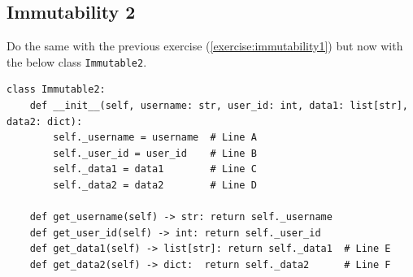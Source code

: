 \documentclass[oneside,11pt,dvipsnames]{book}
\newcommand{\code}[1]{\texttt{#1}}
\begin{document}
\subsection{Immutability 2}\label{exercise:immutability2}
Do the same with the previous exercise (\autoref{exercise:immutability1}) but now with the below class \code{Immutable2}.
\begin{lstlisting}
class Immutable2:
    def __init__(self, username: str, user_id: int, data1: list[str], data2: dict):
        self._username = username  # Line A
        self._user_id = user_id    # Line B
        self._data1 = data1        # Line C
        self._data2 = data2        # Line D
        
    def get_username(self) -> str: return self._username
    def get_user_id(self) -> int: return self._user_id
    def get_data1(self) -> list[str]: return self._data1  # Line E
    def get_data2(self) -> dict:  return self._data2      # Line F
\end{lstlisting}






\end{document}
